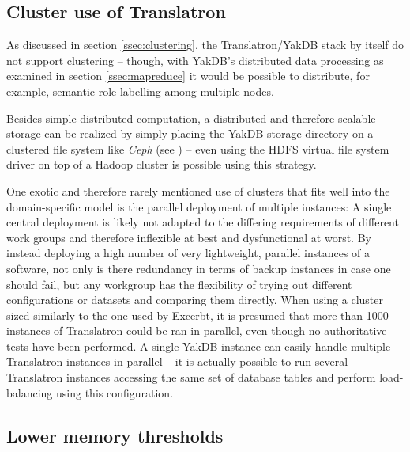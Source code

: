 \documentclass[a4paper, 12pt, twoside, reqn]{report}
\numberwithin{figure}{chapter}
\newtheorem[L]{boxedDefinition}{Definition}
\newtheorem[L]{boxedExample}{Example}
\begin{document}
\subsection{Cluster use of Translatron}\label{limitations:clustering}
 
As discussed in section \ref{ssec:clustering}, the Translatron/YakDB stack by itself do not support clustering -- though, with YakDB's distributed data processing as examined in section \ref{ssec:mapreduce} it would be possible to distribute, for example, semantic role labelling among multiple nodes.

Besides simple distributed computation, a distributed and therefore scalable storage can be realized by simply placing the YakDB storage directory on a clustered file system like \textit{Ceph} (see \cite{weil2006ceph}) -- even using the HDFS virtual file system driver on top of a Hadoop cluster is possible using this strategy.

One exotic and therefore rarely mentioned use of clusters that fits well into the domain-specific model is the parallel deployment of multiple instances: A single central deployment is likely not adapted to the differing requirements of different work groups and therefore inflexible at best and dysfunctional at worst. By instead deploying a high number of very lightweight, parallel instances of a software, not only is there redundancy in terms of backup instances in case one should fail, but any workgroup has the flexibility of trying out different configurations or datasets and comparing them directly. When using a cluster sized similarly to the one used by Excerbt, it is presumed that more than \num{1000} instances of Translatron could be ran in parallel, even though no authoritative tests have been performed. A single YakDB instance can easily handle multiple Translatron instances in parallel -- it is actually possible to run several Translatron instances accessing the same set of database tables and perform load-balancing using this configuration.

\subsection{Lower memory thresholds}\label{ssec:lower-memory-thresholds}
\end{document}
